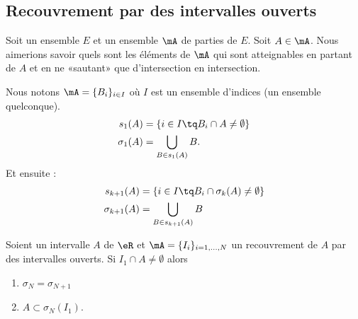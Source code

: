 \subsection{Recouvrement par des intervalles ouverts}

Soit un ensemble \( E\) et un ensemble \( \mA\) de parties de \( E\). Soit \( A\in \mA\). Nous aimerions savoir quels sont les éléments de \( \mA\) qui sont atteignables en partant de \( A\) et en ne «sautant» que d'intersection en intersection.

Nous notons \( \mA=\{ B_i \}_{i\in I}\) où \( I\) est un ensemble d'indices (un ensemble quelconque).
\begin{subequations}
	\begin{align}
		s_1(A)      & =\{  i\in I\tq B_i\cap A\neq \emptyset   \} \\
		\sigma_1(A) & =\bigcup_{B\in s_1(A)}B.
	\end{align}
\end{subequations}
Et ensuite :
\begin{subequations}
	\begin{align}
		s_{k+1}(A)      & =\{ i\in I\tq B_i\cap \sigma_k(A)\neq \emptyset \} \\
		\sigma_{k+1}(A) & =\bigcup_{B\in s_{k+1}(A)}B
	\end{align}
\end{subequations}

\begin{lemma}
	Soient un intervalle \( A\) de \( \eR\) et \( \mA=\{ I_i \}_{i=1,\ldots, N}\) un recouvrement de \( A\) par des intervalles ouverts. Si \( I_1\cap A\neq \emptyset\) alors
	\begin{enumerate}
		\item
		      \( \sigma_{N}=\sigma_{N+1}\)
		\item
		      \( A\subset \sigma_N(I_1)\).
	\end{enumerate}
\end{lemma}

